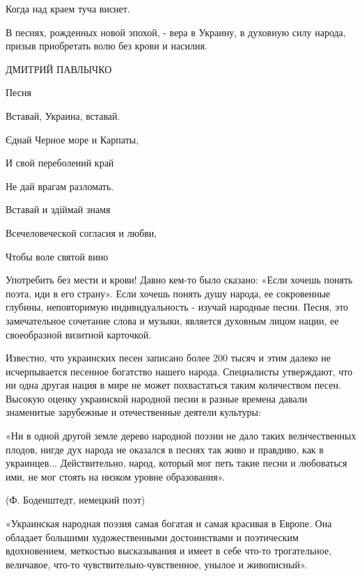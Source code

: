 Когда над краем туча виснет.



В песнях, рожденных новой эпохой, - вера в Украину, в духовную силу народа, призыв приобретать волю без крови и насилия.



ДМИТРИЙ ПАВЛЫЧКО



Песня



Вставай, Украина, вставай.



Єднай Черное море и Карпаты,



И свой переболений край



Не дай врагам разломать.



Вставай и здіймай знамя



Всечеловеческой согласия и любви,



Чтобы воле святой вино



Употребить без мести и крови!
Давно кем-то было сказано: «Если хочешь понять поэта, иди в его страну». Если хочешь понять душу народа, ее сокровенные глубины, неповторимую индивидуальность - изучай народные песни. Песня, это замечательное сочетание слова и музыки, является духовным лицом нации, ее своеобразной визитной карточкой.



Известно, что украинских песен записано более 200 тысяч и этим далеко не исчерпывается песенное богатство нашего народа. Специалисты утверждают, что ни одна другая нация в мире не может похвастаться таким количеством песен. Высокую оценку украинской народной песни в разные времена давали знаменитые зарубежные и отечественные деятели культуры:



«Ни в одной другой земле дерево народной поэзии не дало таких величественных плодов, нигде дух народа не оказался в песнях так живо и правдиво, как в украинцев... Действительно, народ, который мог петь такие песни и любоваться ими, не мог стоять на низком уровне образования».



(Ф. Боденштедт, немецкий поэт)



«Украинская народная поэзия самая богатая и самая красивая в Европе. Она обладает большими художественными достоинствами и поэтическим вдохновением, меткостью высказывания и имеет в себе что-то трогательное, величавое, что-то чувствительно-чувственное, унылое и живописный».




